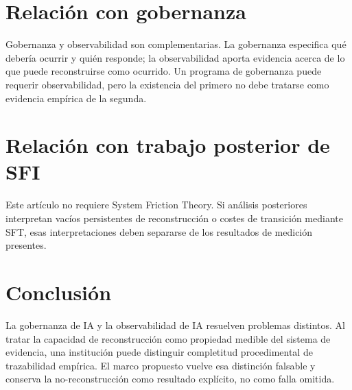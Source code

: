 \documentclass[11pt]{article}
\begin{document}
\section{Relación con gobernanza}
Gobernanza y observabilidad son complementarias. La gobernanza especifica qué debería ocurrir y quién responde; la observabilidad aporta evidencia acerca de lo que puede reconstruirse como ocurrido. Un programa de gobernanza puede requerir observabilidad, pero la existencia del primero no debe tratarse como evidencia empírica de la segunda.

\section{Relación con trabajo posterior de SFI}
Este artículo no requiere System Friction Theory. Si análisis posteriores interpretan vacíos persistentes de reconstrucción o costes de transición mediante SFT, esas interpretaciones deben separarse de los resultados de medición presentes.

\section{Conclusión}
La gobernanza de IA y la observabilidad de IA resuelven problemas distintos. Al tratar la capacidad de reconstrucción como propiedad medible del sistema de evidencia, una institución puede distinguir completitud procedimental de trazabilidad empírica. El marco propuesto vuelve esa distinción falsable y conserva la no-reconstrucción como resultado explícito, no como falla omitida.
\end{document}

